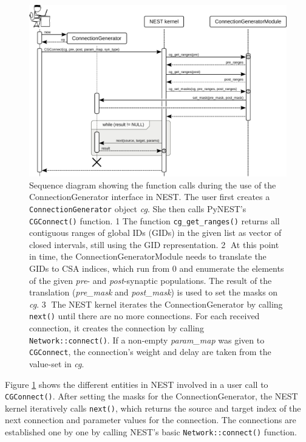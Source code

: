 \documentclass{frontiersSCNS} %
\begin{document}
\begin{figure}[ht]
\centering
\includegraphics[scale=.8]{figures/sequence_diagram_nest.pdf}
\caption{Sequence diagram showing the function calls during the use of
  the ConnectionGenerator interface in NEST. The user first creates a
  \texttt{ConnectionGenerator} object \emph{cg}. She then calls
  PyNEST's \texttt{CGConnect()} function. \textcircled{\footnotesize
    1} The function \texttt{cg\_get\_ranges()} returns all contiguous
  ranges of global IDs (GIDs) in the given list as vector of closed
  intervals, still using the GID representation.
  \textcircled{\footnotesize 2} At this point in time, the
  ConnectionGeneratorModule needs to translate the GIDs to CSA
  indices, which run from 0 and enumerate the elements of the given
  \emph{pre}- and \emph{post}-synaptic populations. The result of the
  translation (\emph{pre\_mask} and \emph{post\_mask}) is used to set
  the masks on \emph{cg}. \textcircled{\footnotesize 3} The NEST
  kernel iterates the ConnectionGenerator by calling \texttt{next()}
  until there are no more connections. For each received connection,
  it creates the connection by calling \texttt{Network::connect()}. If
  a non-empty \emph{param\_map} was given to \texttt{CGConnect}, the
  connection's weight and delay are taken from the value-set in
  \emph{cg}.}\label{fig:sequence_diagram_nest}
\end{figure}

Figure \ref{fig:sequence_diagram_nest} shows the different entities in
NEST involved in a user call to \verb|CGConnect()|. After setting the
masks for the ConnectionGenerator, the NEST kernel iteratively calls
\verb|next()|, which returns the source and target index of the next
connection and parameter values for the connection. The connections
are established one by one by calling NEST's basic
\verb|Network::connect()| function.
\end{document}
